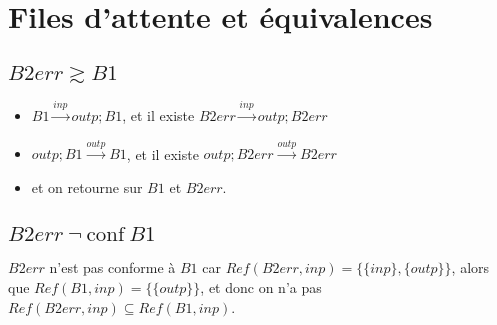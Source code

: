 \documentclass[a4paper,french,9pt]{article}
\def\transition#1{\stackrel{#1}{\longrightarrow}}
\def\conf{\ \text{conf}\ }
\let\simule\gtrsim
\begin{document}
\section{Files d'attente et équivalences}
\subsection{$B2err\simule B1$}

\begin{itemize}
\item $B1\transition{inp} outp;B1$, et il existe $B2err\transition{inp}outp;B2err$
\item $outp;B1\transition{outp}B1$, et il existe $outp;B2err\transition{outp}B2err$
\item et on retourne sur $B1$ et $B2err$.
\end{itemize}

\subsection{$B2err\ \neg\conf B1$}
$B2err$ n'est pas conforme à $B1$ car $Ref(B2err, inp) = \{\{inp\}, \{outp\}\}$, alors que $Ref(B1,inp) = \{\{outp\}\}$,
et donc on n'a pas $Ref(B2err, inp) \subseteq Ref(B1, inp)$.
\end{document}
